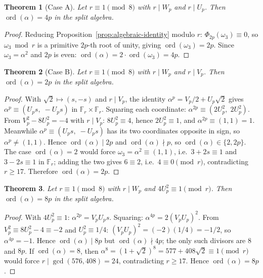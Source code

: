 \documentclass[12pt]{article}
\theoremstyle{plain}
\newtheorem{theorem}{Theorem}[section]
\theoremstyle{definition}
\theoremstyle{remark}
\begin{document}
\begin{theorem}[Case A]\label{thm:case-A}
Let \(r \equiv 1 \pmod{8}\) with
\(r \mid W_p\) and \(r \mid U_p\). Then
\(\operatorname{ord}(\alpha) = 4p\) in the split algebra.
\end{theorem}


\begin{proof}
Reducing Proposition~\ref{prop:algebraic-identity} modulo \(r\):
\(\Phi_{2p}(\omega_3) \equiv 0\), so \(\omega_3 \bmod r\) is a
primitive \(2p\)-th root of unity, giving
\(\operatorname{ord}(\omega_3) = 2p\). Since \(\omega_3 = \alpha^2\)
and \(2p\) is even:
\(\operatorname{ord}(\alpha) = 2 \cdot \operatorname{ord}(\omega_3)
= 4p\).\end{proof}


\begin{theorem}[Case B]\label{thm:case-B}
Let \(r \equiv 1 \pmod{8}\) with
\(r \mid W_p\) and \(r \mid V_p\). Then
\(\operatorname{ord}(\alpha) = 2p\) in the split algebra.
\end{theorem}


\begin{proof}
With \(\sqrt 2 \mapsto (s, -s)\) and \(r \mid V_p\), the
identity \(\alpha^p = V_p/2 + U_p\sqrt{2}\) gives
\(\alpha^p \equiv (U_p s,\; -U_p s)\) in
\(\mathbb{F}_r \times \mathbb{F}_r\). Squaring each coordinate:
\(\alpha^{2p} \equiv (2U_p^2,\; 2U_p^2)\). From
\(V_p^2 - 8U_p^2 = -4\) with \(r \mid V_p\): \(8U_p^2 \equiv 4\),
hence \(2U_p^2 \equiv 1\), and \(\alpha^{2p} \equiv (1, 1) = 1\).
Meanwhile \(\alpha^p \equiv (U_p s,\; -U_p s)\) has its two
coordinates opposite in sign, so \(\alpha^p \neq (1, 1)\). Hence
\(\operatorname{ord}(\alpha) \mid 2p\) and \(\operatorname{ord}
(\alpha) \nmid p\), so \(\operatorname{ord}(\alpha) \in \{2, 2p\}\).
The case \(\operatorname{ord}(\alpha) = 2\) would force
\(\omega_3 = \alpha^2 \equiv (1, 1)\), i.e.\ \(3 + 2s \equiv 1\)
and \(3 - 2s \equiv 1\) in \(\mathbb F_r\); adding the two gives
\(6 \equiv 2\), i.e.\ \(4 \equiv 0 \pmod r\), contradicting
\(r \geq 17\). Therefore \(\operatorname{ord}(\alpha) = 2p\).\end{proof}


\begin{theorem}\label{thm:case-4U}
Let \(r \equiv 1 \pmod{8}\) with \(r \mid W_p\)
and \(4U_p^2 \equiv 1 \pmod{r}\). Then
\(\operatorname{ord}(\alpha) = 8p\) in the split algebra.
\end{theorem}


\begin{proof}
With \(4U_p^2 \equiv 1\):
\(\alpha^{2p} = V_p U_p s\). Squaring:
\(\alpha^{4p} = 2(V_p U_p)^2\). From \(V_p^2 \equiv 8U_p^2 - 4
\equiv -2\) and \(U_p^2 \equiv 1/4\):
\((V_p U_p)^2 = (-2)(1/4) = -1/2\), so
\(\alpha^{4p} = -1\). Hence \(\operatorname{ord}(\alpha) \mid 8p\)
but \(\operatorname{ord}(\alpha) \nmid 4p\); the only such divisors
are \(8\) and \(8p\). If \(\operatorname{ord}(\alpha) = 8\), then
\(\alpha^8 = (1+\sqrt 2)^8 = 577 + 408\sqrt 2 \equiv 1 \pmod r\)
would force \(r \mid \gcd(576, 408) = 24\), contradicting \(r \geq 17\).
Hence \(\operatorname{ord}(\alpha) = 8p\).\end{proof}
\end{document}
